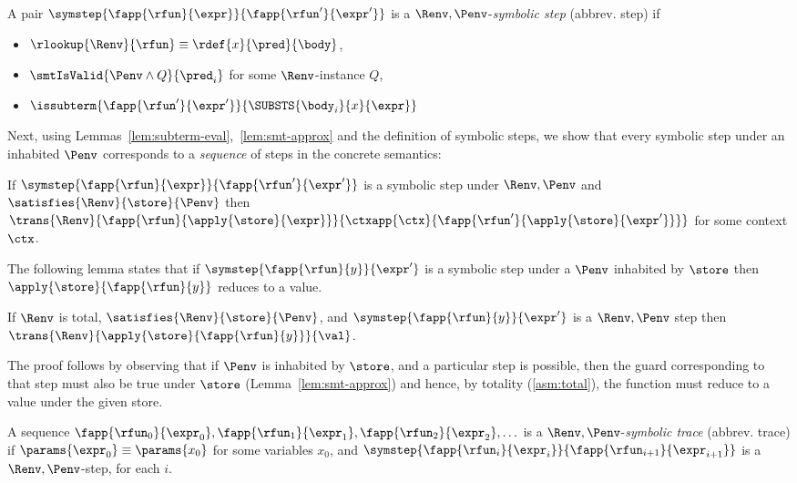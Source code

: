 %
A pair
$\symstep{\fapp{\rfun}{\expr}}{\fapp{\rfun'}{\expr'}}$
is a
$\Renv,\Penv$-\emph{symbolic step} (abbrev. step)
if
%
\begin{itemize}
  \item $\rlookup{\Renv}{\rfun} \equiv \rdef{x}{\pred}{\body}$,
  \item $\smtIsValid{\Penv \wedge Q}{\pred_i}$ for some $\Renv$-instance $Q$,
  \item $\issubterm{\fapp{\rfun'}{\expr'}}{\SUBSTS{\body_i}{x}{\expr}}$
\end{itemize}

%
Next, using Lemmas~\ref{lem:subterm-eval},~\ref{lem:smt-approx}
and the definition of symbolic steps, we show that every
symbolic step under an inhabited $\Penv$ corresponds
to a \emph{sequence} of steps in the concrete semantics:

\begin{lemma}\label{lem:step-reductions}
If   $\symstep{\fapp{\rfun}{\expr}}{\fapp{\rfun'}{\expr'}}$
     is a symbolic step under $\Renv, \Penv$
     and
     $\satisfies{\Renv}{\store}{\Penv}$
then $\trans{\Renv}
            {\fapp{\rfun}{\apply{\store}{\expr}}}
            {\ctxapp{\ctx}{\fapp{\rfun'}{\apply{\store}{\expr'}}}}$
for some context $\ctx$.
\end{lemma}

%
The following lemma states that if
$\symstep{\fapp{\rfun}{y}}{\expr'}$
is a symbolic step under a $\Penv$
inhabited by $\store$ then
$\apply{\store}{\fapp{\rfun}{y}}$
reduces to a value.

\begin{lemma}\label{lem:step-value}
If $\Renv$ is total,
   $\satisfies{\Renv}{\store}{\Penv}$, and
   $\symstep{\fapp{\rfun}{y}}{\expr'}$ is a $\Renv,\Penv$ step
then $\trans{\Renv}{\apply{\store}{\fapp{\rfun}{y}}}{\val}$.
\end{lemma}

The proof follows by observing that if $\Penv$
is inhabited by $\store$, and a particular step
is possible, then the guard corresponding to that
step must also be true under $\store$ (Lemma~\ref{lem:smt-approx})
and hence, by totality (\ref{asm:total}),
the function must reduce to a value under the given store.

%
A sequence
%
$\fapp{\rfun_0}{\expr_0},\fapp{\rfun_1}{\expr_1},\fapp{\rfun_2}{\expr_2},\ldots$
%
is a $\Renv,\Penv$-\emph{symbolic trace} (abbrev. trace)
if $\params{\expr_0} \equiv \params{x_0}$ for some variables $x_0$,
and $\symstep{\fapp{\rfun_i}{\expr_i}}{\fapp{\rfun_{i+1}}{\expr_{i+1}}}$
is a $\Renv,\Penv$-step, for each $i$.

